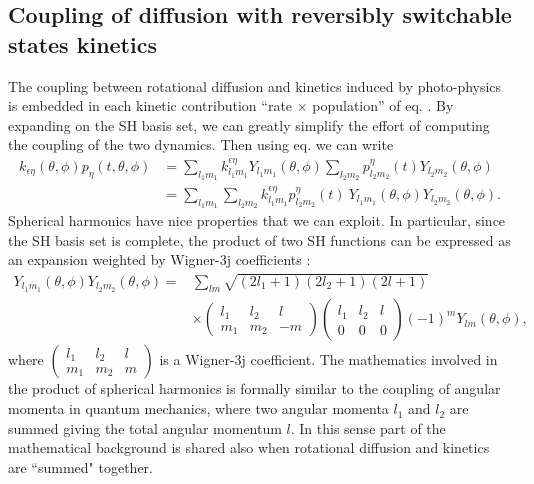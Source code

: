 \documentclass{article}
\begin{document}
\subsection{Coupling of diffusion with reversibly switchable states kinetics}
The coupling between rotational diffusion and kinetics induced by photo-physics is embedded in each kinetic contribution ``rate $\times$ population'' of eq. . By expanding on the SH basis set, we can greatly simplify the effort of computing the coupling of the two dynamics. Then using eq.  we can write
\begin{equation}\label{eq:coupling}
\begin{aligned}
    k_{\epsilon\eta} (\theta,\phi) p_\eta(t,\theta,\phi) & =
        \sum_{l_1m_1} k^{\epsilon\eta}_{l_1m_1} Y_{l_1m_1}(\theta,\phi)
        \sum_{l_2m_2} p^{\eta}_{l_2m_2}(t) Y_{l_2m_2}(\theta,\phi)
        \\
    &=
        \sum_{l_1m_1} \sum_{l_2m_2}
        k^{\epsilon\eta}_{l_1m_1}
        p^{\eta}_{l_2m_2}(t) \ Y_{l_1m_1}(\theta,\phi) Y_{l_2m_2}(\theta,\phi).
\end{aligned}
\end{equation}
Spherical harmonics have nice properties that we can exploit. In particular, since the SH basis set is complete, the product of two SH functions can be expressed as an expansion weighted by Wigner-3j coefficients \cite{AngularMomentumBook}:
\begin{equation}\label{eq:sh_product}
\begin{aligned}
    Y_{l_1m_1}(\theta,\phi) Y_{l_2m_2}(\theta,\phi) 
    =&
    \sum_{lm} \sqrt{(2l_1+1)(2l_2+1)(2l+1)} \\
    &\times
    \begin{pmatrix}
        l_1 & l_2 & l\\
        m_1 & m_2 & -m
    \end{pmatrix}
    \begin{pmatrix}
        l_1 & l_2 & l\\
        0 & 0 & 0
    \end{pmatrix}
    (-1)^{m}
    Y_{lm}(\theta,\phi),
\end{aligned}
\end{equation}
where 
$\begin{pmatrix}
    l_1 & l_2 & l\\
    m_1 & m_2 & m
\end{pmatrix}$
is a Wigner-3j coefficient. The mathematics involved in the product of spherical harmonics is formally similar to the coupling of angular momenta in quantum mechanics, where two angular momenta $l_1$ and $l_2$ are summed giving the total angular momentum $l$. In this sense part of the mathematical background is shared also when rotational diffusion and kinetics are ``summed" together.
\end{document}
